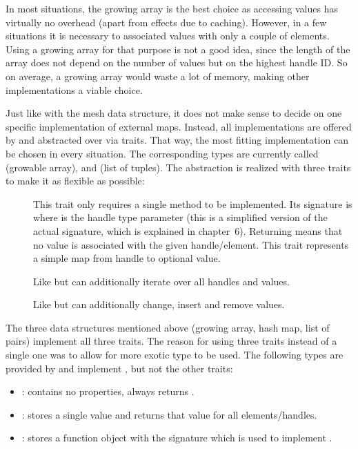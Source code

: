 In most situations, the growing array is the best choice as accessing values has virtually no overhead (apart from effects due to caching).
However, in a few situations it is necessary to associated values with only a couple of elements.
Using a growing array for that purpose is not a good idea, since the length of the array does not depend on the number of values but on the highest handle ID.
So on average, a growing array would waste a lot of memory, making other implementations a viable choice.

Just like with the mesh data structure, it does not make sense to decide on one specific implementation of external maps.
Instead, all implementations are offered by  and abstracted over via traits.
That way, the most fitting implementation can be chosen in every situation.
The corresponding types are currently called  (growable array),  and  (list of tuples).
The abstraction is realized with three traits to make it as flexible as possible:

\begin{description}
  \item [] This trait only requires a single method to be implemented.
  Its signature is  where  is the handle type parameter (this is a simplified version of the actual signature, which is explained in chapter~6).
  Returning  means that no value is associated with the given handle/element.
  This trait represents a simple map from handle to optional value.
  \item [] Like  but can additionally iterate over all handles and values.
  \item [] Like  but can additionally change, insert and remove values.
\end{description}

The three data structures mentioned above (growing array, hash map, list of pairs) implement all three traits.
The reason for using three traits instead of a single one was to allow for more exotic type to be used.
The following types are provided by  and implement , but not the other traits:

\begin{itemize}
\item {}: contains no properties, always returns .
\item {}: stores a single value and returns that value for all elements/handles.
\item {}: stores a function object with the signature  which is used to implement .
\end{itemize}

